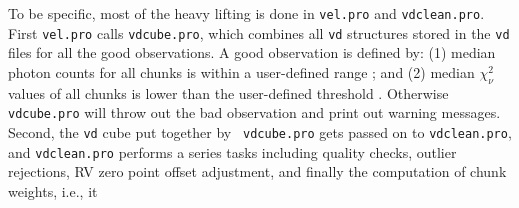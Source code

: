 To be specific, most of the heavy lifting is done in {\tt vel.pro} and
{\tt vdclean.pro}. First {\tt vel.pro} calls {\tt vdcube.pro}, which
combines all {\tt vd} structures stored in the {\tt vd} files for all
the good observations. A good observation is defined by: (1) median
photon counts for all chunks is within a user-defined range
; and (2)
median $\chi_\nu^2$ values of all chunks is lower than the
user-defined threshold . Otherwise
{\tt vdcube.pro} will throw out the bad observation and print out
warning messages. Second, the {\tt vd} cube put together by {\tt
vdcube.pro} gets passed on to {\tt vdclean.pro}, and {\tt vdclean.pro}
performs a series tasks including quality checks, outlier rejections,
RV zero point offset adjustment, and finally the computation of chunk
weights, i.e., it
